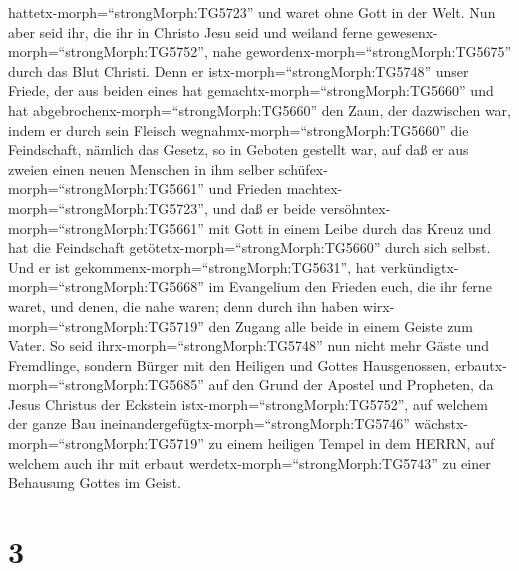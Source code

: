 hattetx-morph=``strongMorph:TG5723'' und waret ohne Gott in der Welt.
 Nun aber seid ihr, die ihr in Christo Jesu seid und
weiland ferne gewesenx-morph=``strongMorph:TG5752'', nahe
gewordenx-morph=``strongMorph:TG5675'' durch das Blut Christi.
 Denn er istx-morph=``strongMorph:TG5748'' unser Friede,
der aus beiden eines hat gemachtx-morph=``strongMorph:TG5660'' und hat
abgebrochenx-morph=``strongMorph:TG5660'' den Zaun, der dazwischen war,
indem er durch sein Fleisch wegnahmx-morph=``strongMorph:TG5660'' die
Feindschaft,  nämlich das Gesetz, so in Geboten gestellt
war, auf daß er aus zweien einen neuen Menschen in ihm selber
schüfex-morph=``strongMorph:TG5661'' und Frieden
machtex-morph=``strongMorph:TG5723'',  und daß er beide
versöhntex-morph=``strongMorph:TG5661'' mit Gott in einem Leibe durch
das Kreuz und hat die Feindschaft getötetx-morph=``strongMorph:TG5660''
durch sich selbst.  Und er ist
gekommenx-morph=``strongMorph:TG5631'', hat
verkündigtx-morph=``strongMorph:TG5668'' im Evangelium den Frieden euch,
die ihr ferne waret, und denen, die nahe waren;  denn durch
ihn haben wirx-morph=``strongMorph:TG5719'' den Zugang alle beide in
einem Geiste zum Vater.  So seid
ihrx-morph=``strongMorph:TG5748'' nun nicht mehr Gäste und Fremdlinge,
sondern Bürger mit den Heiligen und Gottes Hausgenossen, 
erbautx-morph=``strongMorph:TG5685'' auf den Grund der Apostel und
Propheten, da Jesus Christus der Eckstein
istx-morph=``strongMorph:TG5752'',  auf welchem der ganze
Bau ineinandergefügtx-morph=``strongMorph:TG5746''
wächstx-morph=``strongMorph:TG5719'' zu einem heiligen Tempel in dem
HERRN,  auf welchem auch ihr mit erbaut
werdetx-morph=``strongMorph:TG5743'' zu einer Behausung Gottes im Geist.

\hypertarget{section-2}{%
\section{3}\label{section-2}}

